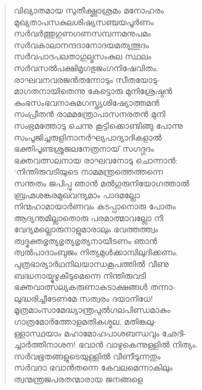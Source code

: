 \begin{verse}
വിഖ്യാതമായ സുതീക്ഷ്ണാശ്രമം മനോഹരം\\
മുഖ്യതാപസകുലശിഷ്യസഞ്ചയപൂര്‍ണം\\
സര്‍വര്‍ത്തുഗുണഗണസമ്പന്നമനുപമം\\
സര്‍വകാലാനന്ദദാനോദയമത്യത്ഭുദം\\
സര്‍വപാദപലതാഗുല്മസംകുല സ്ഥലം\\
സര്‍വസല്‍പക്ഷിമൃഗഭുജംഗനിഷേവിതം.\\
രാഘവനവരജന്‍തന്നോടും സീതയോടു-\\
മാഗതനായിതെന്നു കേട്ടൊരു മുനിശ്രേഷ്ഠന്‍\\
കുംഭസംഭവനാകുമഗസ്ത്യശിഷ്യോത്തമന്‍\\
സംപ്രീതന്‍ രാമമന്ത്രോപാസനരതന്‍ മുനി\\
സംഭ്രമത്തോടു ചെന്നു കൂട്ടിക്കൊണ്ടിങ്ങു പോന്നു\\
സംപൂജിച്ചരുളിനാനര്‍ഘ്യപാദ്യാദികളാല്‍\\
ഭക്തിപൂണ്ടശ്രുജലനേത്രനായ് സഗദ്ഗദം\\
ഭക്തവത്സലനായ രാഘവനോടു ചൊന്നാന്‍:\\
‘നിന്തിരുവടിയുടെ നാമമന്ത്രത്തെത്തന്നെ\\
സന്തതം ജപിപ്പു ഞാന്‍ മല്‍ഗുരുനിയോഗത്താല്‍\\
ബ്രഹ്മശങ്കരമുഖവന്ദ്യമാം പാദമല്ലോ\\
നിന്മഹാമായാര്‍ണവം കടപ്പാനൊരു പോതം\\
ആദ്യന്തമില്ലാതൊരു പരമാത്മാവല്ലോ നീ\\
വേദ്യമല്ലൊരുനാളുമാരാലും ഭവത്തത്ത്വം\\
ത്വദ്ഭക്തഭൃത്യഭൃത്യഭൃത്യനായീടണം ഞാന്‍\\
ത്വല്‍പാദാംബുജം നിത്യമുള്‍ക്കാമ്പിലുദിക്കണം.\\
പുത്രഭാര്യാര്‍ഥനിലയാന്ധകൂപത്തില്‍ വീണു\\
ബദ്ധനായ്മുഴുകീടുമെന്നെ നിന്തിരുവടി\\
ഭക്തവാത്സല്യകരുണാകടാക്ഷങ്ങള്‍ തന്നാ-\\
ലുദ്ധരിച്ചീടേണമേ സത്വരം ദയാനിധേ!\\
മൂത്രമാംസാമേദ്ധ്യാന്ത്രപുല്‍ഗലപിണ്ഡമാകും\\
ഗാത്രമോര്‍ത്തോളമതികശ്മല, മതിങ്കലു-\\
ള്ളാസ്ഥയാം മഹാമോഹപാശബന്ധവും ഛേദി-\\
ച്ചാര്‍ത്തിനാശന! ഭവാന്‍ വാഴുകെന്നുള്ളില്‍ നിത്യം.\\
സര്‍വഭൂതങ്ങളുടെയുള്ളില്‍ വീണീടുന്നതും\\
സര്‍വദാ ഭവാന്‍തന്നെ കേവലമെന്നാകിലും\\
ത്വന്മന്ത്രജപരതന്മാരായ ജനങ്ങളെ\\

\end{verse}
